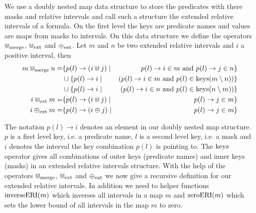 We use a doubly nested map data structure to store the predicates with there masks and relative intervals and call such a structure the extended relative intervals of a formula.
On the first level the keys are predicate names and values are maps from masks to intervals.
On this data structure we define the operators $\Cup_{\text{merge}}$, $\Cup_{\text{ext}}$ and $\oplus_{\text{ext}}$.
Let $m$ and $n$ be two extended relative intervals and $i$ a positive interval, then 
\begin{align*}
    m \Cup_{\text{merge}} n = 
        & \{ p(l) \rightarrow (i \Cup j) \mid &
            p(l) \rightarrow i \in m \text{ and } 
            p(l) \rightarrow j \in n \} \\
        & \cup \{p(l) \rightarrow i \mid & 
            (p(l) \rightarrow i \in m \text{ and }
            p(l) \in \operatorname{keys}({m \setminus n})) \} \\
        & \cup \{p(l) \rightarrow i \mid & 
            (p(l) \rightarrow i \in n \text{ and }
            p(l) \in \operatorname{keys}({n \setminus m}))
            \}        
            \\
    i \Cup_{\text{ext}} m = 
        & \{ p(l) \rightarrow (i \Cup j) \mid &
            p(l) \rightarrow j \in m \} \\
    i \oplus_{\text{ext}} m = 
        & \{ p(l) \rightarrow (i \oplus j) \mid &
            p(l) \rightarrow j \in m \} \\
\end{align*}

The notation $p(l) \rightarrow i$ denotes an element in our doubly nested map structure.
$p$ is a first level key, i.e. a predicate name, $l$ is a second level key, i.e. a mask and $i$ denotes the interval the key combination $p(l)$ is pointing to.
The $\operatorname{keys}$ operator gives all combinations of outer keys (predicate names) and inner keys (masks) in an extended relative intervals structure.
With the help of the operators $\Cup_{\text{merge}}$, $\Cup_{\text{ext}}$ and $\oplus_{\text{ext}}$ we now give a recursive definition for our extended relative intervals.
In addition we need to helper functions $\operatorname{inverseERI}(m)$ which inverses all intervals in a map $m$ and $\operatorname{zeroERI}(m)$ which sets the lower bound of all intervals in the map $m$ to zero.

